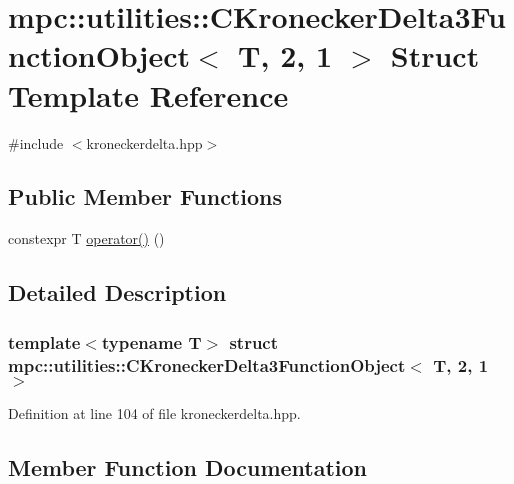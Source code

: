 \hypertarget{structmpc_1_1utilities_1_1_c_kronecker_delta3_function_object_3_01_t_00_012_00_011_01_4}{}\section{mpc\+:\+:utilities\+:\+:C\+Kronecker\+Delta3\+Function\+Object$<$ T, 2, 1 $>$ Struct Template Reference}
\label{structmpc_1_1utilities_1_1_c_kronecker_delta3_function_object_3_01_t_00_012_00_011_01_4}


{\ttfamily \#include $<$kroneckerdelta.\+hpp$>$}

\subsection*{Public Member Functions}
\begin{DoxyCompactItemize}
\item 
constexpr T \mbox{\hyperlink{structmpc_1_1utilities_1_1_c_kronecker_delta3_function_object_3_01_t_00_012_00_011_01_4_ab982e128c5a41cabeee6472e149cb893}{operator()}} ()
\end{DoxyCompactItemize}


\subsection{Detailed Description}
\subsubsection*{template$<$typename T$>$\newline
struct mpc\+::utilities\+::\+C\+Kronecker\+Delta3\+Function\+Object$<$ T, 2, 1 $>$}



Definition at line 104 of file kroneckerdelta.\+hpp.



\subsection{Member Function Documentation}
\mbox{\label{structmpc_1_1utilities_1_1_c_kronecker_delta3_function_object_3_01_t_00_012_00_011_01_4_ab982e128c5a41cabeee6472e149cb893}} 
